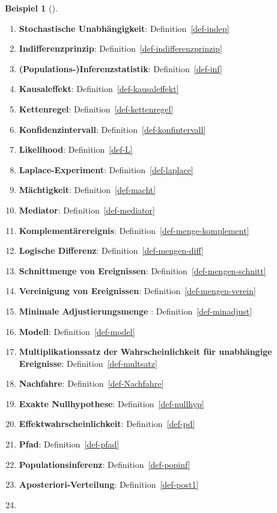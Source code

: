 \documentclass[
  ngerman,
  letterpaper,
  twoside,
  open=any]{scrbook}
\theoremstyle{definition}
\newtheorem{example}{Beispiel}[chapter]
\theoremstyle{plain}
\theoremstyle{definition}
\theoremstyle{definition}
\theoremstyle{remark}
\begin{document}
\begin{example}[]
\begin{enumerate}
  \textbf{Indirekter Effekt}: Definition~\ref{def-ind-eff}
\item
  \textbf{Stochastische Unabhängigkeit}: Definition~\ref{def-indep}
\item
  \textbf{Indifferenzprinzip}: Definition~\ref{def-indifferenzprinzip}
\item
  \textbf{(Populations-)Inferenzstatistik}: Definition~\ref{def-inf}
\item
  \textbf{Kausaleffekt}: Definition~\ref{def-kausaleffekt}
\item
  \textbf{Kettenregel}: Definition~\ref{def-kettenregel}
\item
  \textbf{Konfidenzintervall}: Definition~\ref{def-konfintervall}
\item
  \textbf{Likelihood}: Definition~\ref{def-L}
\item
  \textbf{Laplace-Experiment}: Definition~\ref{def-laplace}
\item
  \textbf{Mächtigkeit}: Definition~\ref{def-macht}
\item
  \textbf{Mediator}: Definition~\ref{def-mediator}
\item
  \textbf{Komplementärereignis}: Definition~\ref{def-menge-komplement}
\item
  \textbf{Logische Differenz}: Definition~\ref{def-mengen-diff}
\item
  \textbf{Schnittmenge von Ereignissen}:
  Definition~\ref{def-mengen-schnitt}
\item
  \textbf{Vereinigung von Ereignissen}:
  Definition~\ref{def-mengen-verein}
\item
  \textbf{Minimale Adjustierungsmenge }: Definition~\ref{def-minadjust}
\item
  \textbf{Modell}: Definition~\ref{def-model}
\item
  \textbf{Multiplikationssatz der Wahrscheinlichkeit für unabhängige
  Ereignisse}: Definition~\ref{def-multsatz}
\item
  \textbf{Nachfahre}: Definition~\ref{def-Nachfahre}
\item
  \textbf{Exakte Nullhypothese}: Definition~\ref{def-nullhyp}
\item
  \textbf{Effektwahrscheinlichkeit}: Definition~\ref{def-pd}
\item
  \textbf{Pfad}: Definition~\ref{def-pfad}
\item
  \textbf{Populationsinferenz}: Definition~\ref{def-popinf}
\item
  \textbf{Aposteriori-Verteilung}: Definition~\ref{def-post1}
\item

\end{enumerate}
\end{example}
\end{document}
